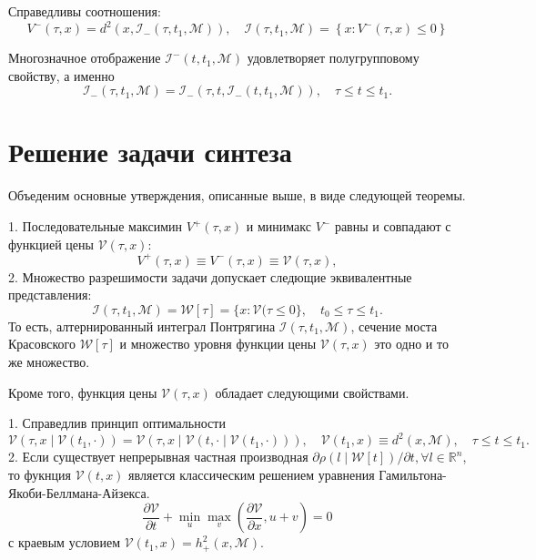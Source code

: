 \begin{lemma}
    Справедливы соотношения:
    \[
        V^-(\tau, x) = d^2(x, \mathcal{I}_-(\tau, t_1, \mathcal{M})), \quad
        \mathcal{I}(\tau, t_1, \mathcal{M}) = \left\{ x : V^-(\tau, x) \le 0 \right\} 
    \]
\end{lemma}

\begin{lemma}
    Многозначное отображение \( \mathcal{I}^-(t, t_1, \mathcal{M}) \) удовлетворяет полугрупповому
     свойству, а именно
    \[
        \mathcal{I}_-(\tau, t_1, \mathcal{M}) = \mathcal{I}_-(\tau, t, \mathcal{I}_-(t, t_1,
         \mathcal{M})), \quad \tau \le t \le t_1.
    \]

\end{lemma}


\section{Решение задачи синтеза}
Объеденим основные утверждения, описанные выше, в виде следующей теоремы.
\begin{theorem}
    1. Последовательные максимин \( V^+(\tau, x) \) и минимакс \( V^-\) равны и совпадают с функцией
     цены \( \mathcal{V}(\tau,x) \):
    \[
        V^+(\tau, x) \equiv V^-(\tau, x) \equiv \mathcal{V}(\tau, x),
    \]
    2. Множество разрешимости задачи допускает следющие эквивалентные представления:
    \[
        \mathcal{I}(\tau, t_1, \mathcal{M}) = \mathcal{W}[\tau] = \{ x : \mathcal{V}(\tau \le 0 \},
         \quad t_0 \le \tau \le t_1.
    \]
    То есть, алтернированный интеграл Понтрягина \( \mathcal{I}(\tau, t_1, \mathcal{M}) \), сечение
     моста Красовского \( \mathcal{W}[\tau] \) и множество уровня функции цены
     \( \mathcal{V}(\tau, x) \) это одно и то же множество.
\end{theorem}
Кроме того, функция цены \( \mathcal{V}(\tau, x) \) обладает следующими свойствами.
\begin{theorem}
    1. Справедлив принцип оптимальности
    \[
        \mathcal{V}(\tau, x \mid \mathcal{V}(t_1, \cdot)) = \mathcal{V}(\tau, x \mid \mathcal{V}(t, 
         \cdot \mid \mathcal{V}(t_1, \cdot))), \quad \mathcal{V}(t_1, x) \equiv d^2(x, \mathcal{M}),
         \quad \tau \le t \le t_1. 
    \]
    2. Если существует непрерывная частная производная \( \partial \rho(l \mid \mathcal{W}[t]) / 
     \partial t, \forall l \in \mathbb{R}^n \), то фукнция \( \mathcal{V}(t, x) \) является 
     классическим решением уравнения Гамильтона-Якоби-Беллмана-Айзекса.
    \[
        \frac{\partial \mathcal{V}}{\partial t} + \min_u \max_v \left( \frac{\partial \mathcal{V}}
         {\partial x}, u + v \right) = 0
    \]
    с краевым условием \( \mathcal{V}(t_1, x) = h_+^2(x, \mathcal{M}) \).
\end{theorem}

